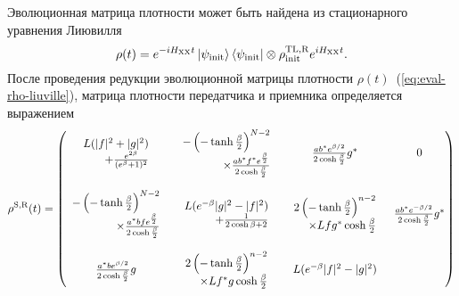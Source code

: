 Эволюционная матрица плотности может быть найдена из стационарного уравнения Лиювилля
\begin{equation}\label{eq:eval-rho-liuville}
  \rho(t) = e^{-iH_\mathrm{XX}t}
    \left| \psi_\mathrm{init} \right\rangle \left\langle \psi_\mathrm{init} \right|
    \otimes
    \rho^\mathrm{TL, R}_\mathrm{init}
    e^{iH_\mathrm{XX}t}.
\end{equation}
После проведения редукции эволюционной матрицы плотности $\rho(t)$~(\ref{eq:eval-rho-liuville}),
матрица плотности передатчика и приемника определяется выражением
%
\small
\begin{equation}\label{eq:eval-rho-sr}
\rho^\mathrm{S,R}(t) =
\begin{pmatrix}
  \begin{array}{r}
    L(|f|^2+|g|^2) \\
    + \frac{e^{2\beta}}{(e^{\beta}+1)^2}
  \end{array}
  &
  \begin{array}{r}
    -\left( -\tanh\frac{\beta}{2} \right)^{N-2} \\
    \times \frac{ab^*f^* e^{\frac{\beta}{2}}}{2\cosh\frac{\beta}{2}}
  \end{array}
  &
  \frac{ab^* e^{\beta /2}}{2\cosh\frac{\beta}{2}}g^*
  &
  0\\
  &
  &
  &\\
  \begin{array}{r}
    -\left( -\tanh\frac{\beta}{2} \right)^{N-2} \\
    \times\frac{a^*bf e^{\frac{\beta}{2}}}{2\cosh\frac{\beta}{2}}
  \end{array}
  &
  \begin{array}{r}
    L(e^{-\beta}|g|^2-|f|^2) \\
    +\frac{1}{2\cosh{\beta}+2}
  \end{array}
  &
  \begin{array}{r}
    {2\left( -\tanh\frac{\beta}{2} \right)^{n-2}}\\
    \times Lfg^*\cosh\frac{\beta}{2}
  \end{array}
  &
  \frac{ab^* e^{-\beta/2}}{2\cosh\frac{\beta}{2}}g^* \\
  &
  &
  &\\
  \frac{a^*b e^{\beta /2}}{2\cosh\frac{\beta}{2}}g
  &
  \begin{array}{r}
   2\left( -\tanh\frac{\beta}{2} \right)^{n-2}\\ \times{Lf^*g\cosh\frac{\beta}{2}}
  \end{array}
  &
  \begin{array}{r}
    L(e^{-\beta}|f|^2 -|g|^2) \\

\end{array}
\end{pmatrix}
\end{equation}
